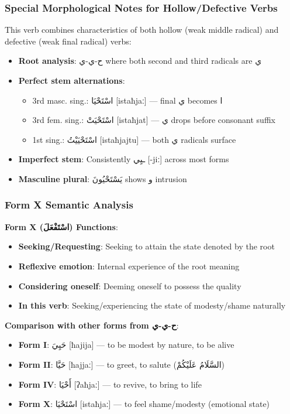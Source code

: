 \documentclass[letterpaper,12pt]{article}
\begin{document}
\subsubsection*{Special Morphological Notes for Hollow/Defective Verbs}
This verb combines characteristics of both hollow (weak middle radical) and defective (weak final radical) verbs:
\begin{itemize}
  \item \textbf{Root analysis}: \textarabic{ح-ي-ي} where both second and third radicals are \textarabic{ي}
  \item \textbf{Perfect stem alternations}:
    \begin{itemize}
      \item 3rd masc. sing.: \textarabic{اسْتَحْيَا} [istaħjaː] — final \textarabic{ي} becomes \textarabic{ا}
      \item 3rd fem. sing.: \textarabic{اسْتَحْيَتْ} [istaħjat] — \textarabic{ي} drops before consonant suffix
      \item 1st sing.: \textarabic{اسْتَحْيَيْتُ} [istaħjajtu] — both \textarabic{ي} radicals surface
    \end{itemize}
  \item \textbf{Imperfect stem}: Consistently \textarabic{ـيِي} [-jiː] across most forms
  \item \textbf{Masculine plural}: \textarabic{يَسْتَحْيُونَ} shows \textarabic{و} intrusion
\end{itemize}

\subsubsection*{Form X Semantic Analysis}
\textbf{Form X (\textarabic{اسْتَفْعَلَ}) Functions}:
\begin{itemize}
  \item \textbf{Seeking/Requesting}: Seeking to attain the state denoted by the root
  \item \textbf{Reflexive emotion}: Internal experience of the root meaning
  \item \textbf{Considering oneself}: Deeming oneself to possess the quality
  \item \textbf{In this verb}: Seeking/experiencing the state of modesty/shame naturally
\end{itemize}

\textbf{Comparison with other forms from \textarabic{ح-ي-ي}}:
\begin{itemize}
  \item \textbf{Form I}: \textarabic{حَيِيَ} [ħajija] — to be modest by nature, to be alive
  \item \textbf{Form II}: \textarabic{حَيَّا} [ħajjaː] — to greet, to salute (\textarabic{السَّلَامُ عَلَيْكُمْ})
  \item \textbf{Form IV}: \textarabic{أَحْيَا} [ʔaħjaː] — to revive, to bring to life
  \item \textbf{Form X}: \textarabic{اسْتَحْيَا} [istaħjaː] — to feel shame/modesty (emotional state)
\end{itemize}
\end{document}
